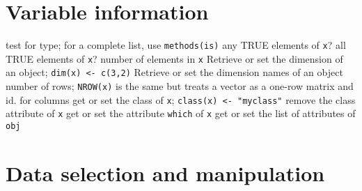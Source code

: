\section{Variable information}{}
	{test for type; for a complete list, use {\tt methods(is)}}
	{any TRUE elements of {\tt x}?}
	{all TRUE elements of {\tt x}?}
	{ number of elements in {\tt x}}
	{Retrieve or set the dimension of an object; {\tt dim(x) <- c(3,2)}}
	{Retrieve or set the dimension names of an object}
	{number of rows; {\tt NROW(x)} is the same but treats a vector as a one-row matrix}
	{and}
	{id. for columns}
	{get or set the class of {\tt x}; {\tt class(x) <- "myclass"}}
	{remove the class attribute of {\tt x}}
	{get or set the attribute {\tt which} of {\tt x}}
	{get or set the list of attributes of {\tt obj}}

\section{Data selection and manipulation}{}


